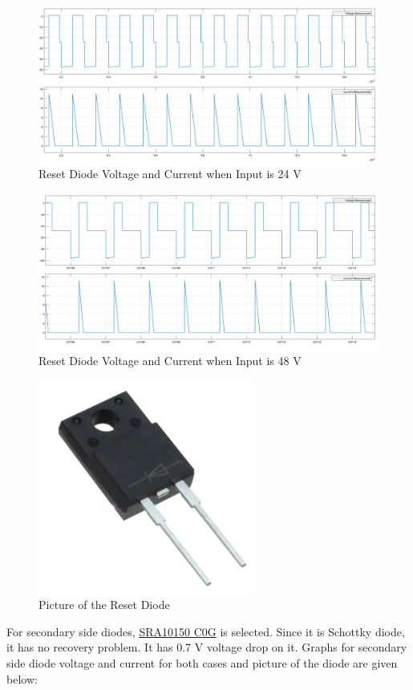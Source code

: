 \documentclass{article}
\begin{document}
\begin{figure}[H]
    \centering
    \includegraphics[scale=0.2]{24v_reset diode.png}
    \caption{Reset Diode Voltage and Current when Input is 24 V}
    \label{fig:my_label}
\end{figure}

\begin{figure}[H]
    \centering
    \includegraphics[scale=0.2]{48v_reset diode.png}
    \caption{Reset Diode Voltage and Current when Input is 48 V}
    \label{fig:my_label}
\end{figure}

\begin{figure}[H]
    \centering
    \includegraphics[scale=0.3]{reset diode.PNG}
    \caption{Picture of the Reset Diode}
    \label{fig:my_label}
\end{figure}
For secondary side diodes, \href{https://www.taiwansemi.com/products/datasheet/SRA1020\%20SERIES_J13.pdf}{SRA10150 C0G} is selected. Since it is Schottky diode, it has no recovery problem. It has 0.7 V voltage drop on it. Graphs for secondary side diode voltage and current for both cases and picture of the diode are given below:
\end{document}
